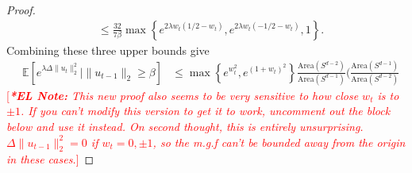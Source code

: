 \documentclass[journal,onecolumn,11pt,final]{IEEEtran}
\newcommand{\1}{\mathbb{1}}
\theoremstyle{plain}
\theoremstyle{definition}
\theoremstyle{plain}
\theoremstyle{plain}
\theoremstyle{definition}
\newcommand{\ELnote}[1]{\textcolor{red}{[{\em {\bf **EL Note:} #1}]}}
\newcommand{\E}{\mathbb{E}}
\begin{document}
\begin{proof}
\begin{align*}
			&\leq \frac{32}{7\beta} \max\left\{e^{2\lambda w_t (1/2 - w_t)} , e^{2\lambda w_t (-1/2 - w_t)}, 1\right\}.
		\end{align*}
		Combining these three upper bounds give
		\begin{align*}
			&\E\left[e^{\lambda \Delta \|u_{t}\|_2^2} \Big| \|u_{t-1}\|_2 \geq \beta \right]
			&\leq \max\left\{e^{w_t^2}, e^{(1+w_t)^2} \right\} \frac{\mathrm{Area}(S^{d-2})}{\mathrm{Area}(S^{d-1})} \Big( \frac{\mathrm{Area}(S^{d-1})}{\mathrm{Area}(S^{d-2})}
		\end{align*}
		\ELnote{This new proof also seems to be very sensitive to how close \(w_t\) is to \(\pm 1\). If you can't modify this version to get it to work, uncomment out the block below and use it instead.		
		On second thought, this is entirely unsurprising. \(\Delta \|u_{t-1}\|_2^2 = 0\) if \(w_t = 0, \pm1\), so the m.g.f can't be bounded away from the origin in these cases.}
%		

\end{proof}
\end{document}
